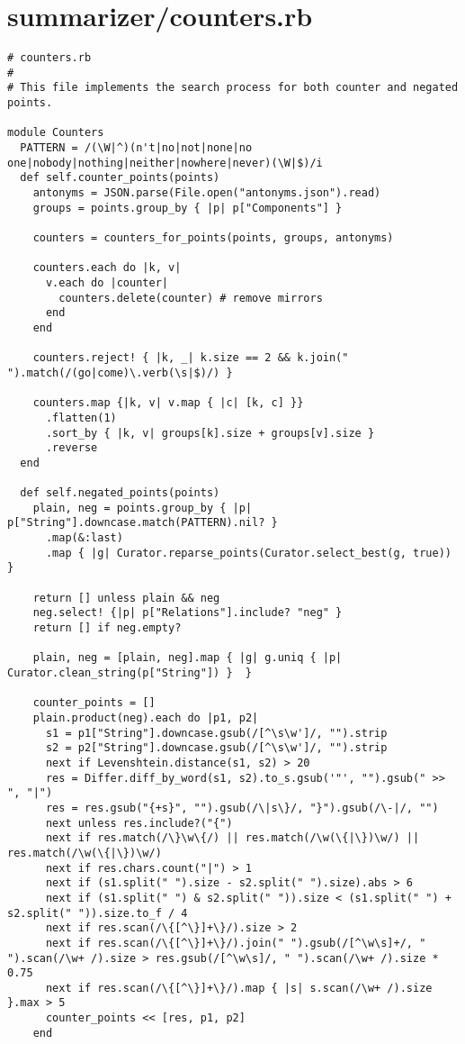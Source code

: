 \documentclass{article}
\begin{document}
\section*{summarizer/counters.rb}
\begin{verbatim}
# counters.rb
#
# This file implements the search process for both counter and negated points.

module Counters
  PATTERN = /(\W|^)(n't|no|not|none|no one|nobody|nothing|neither|nowhere|never)(\W|$)/i
  def self.counter_points(points)
    antonyms = JSON.parse(File.open("antonyms.json").read)
    groups = points.group_by { |p| p["Components"] }

    counters = counters_for_points(points, groups, antonyms)

    counters.each do |k, v|
      v.each do |counter|
        counters.delete(counter) # remove mirrors
      end
    end

    counters.reject! { |k, _| k.size == 2 && k.join(" ").match(/(go|come)\.verb(\s|$)/) }

    counters.map {|k, v| v.map { |c| [k, c] }}
      .flatten(1)
      .sort_by { |k, v| groups[k].size + groups[v].size }
      .reverse
  end

  def self.negated_points(points)
    plain, neg = points.group_by { |p| p["String"].downcase.match(PATTERN).nil? }
      .map(&:last)
      .map { |g| Curator.reparse_points(Curator.select_best(g, true)) }

    return [] unless plain && neg
    neg.select! {|p| p["Relations"].include? "neg" }
    return [] if neg.empty?

    plain, neg = [plain, neg].map { |g| g.uniq { |p| Curator.clean_string(p["String"]) }  }

    counter_points = []
    plain.product(neg).each do |p1, p2|
      s1 = p1["String"].downcase.gsub(/[^\s\w']/, "").strip
      s2 = p2["String"].downcase.gsub(/[^\s\w']/, "").strip
      next if Levenshtein.distance(s1, s2) > 20
      res = Differ.diff_by_word(s1, s2).to_s.gsub('"', "").gsub(" >> ", "|")
      res = res.gsub("{+s}", "").gsub(/\|s\}/, "}").gsub(/\-|/, "")
      next unless res.include?("{")
      next if res.match(/\}\w\{/) || res.match(/\w(\{|\})\w/) || res.match(/\w(\{|\})\w/)
      next if res.chars.count("|") > 1
      next if (s1.split(" ").size - s2.split(" ").size).abs > 6
      next if (s1.split(" ") & s2.split(" ")).size < (s1.split(" ") + s2.split(" ")).size.to_f / 4
      next if res.scan(/\{[^\}]+\}/).size > 2
      next if res.scan(/\{[^\}]+\}/).join(" ").gsub(/[^\w\s]+/, " ").scan(/\w+ /).size > res.gsub(/[^\w\s]/, " ").scan(/\w+ /).size * 0.75
      next if res.scan(/\{[^\}]+\}/).map { |s| s.scan(/\w+ /).size }.max > 5
      counter_points << [res, p1, p2]
    end


\end{verbatim}
\end{document}
